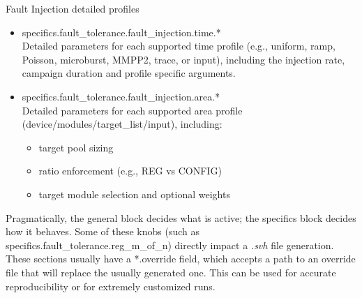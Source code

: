  Fault Injection detailed profiles
\begin{itemize}
    \item specifics.fault\_tolerance.fault\_injection.time.* \\
    Detailed parameters for each supported time profile (e.g., uniform, ramp, Poisson, microburst, MMPP2, trace, or input), including the injection rate, campaign duration and profile specific arguments.
    \item specifics.fault\_tolerance.fault\_injection.area.* \\
    Detailed parameters for each supported area profile (device/modules/target\_list/input), including:
    \begin{itemize}
        \item target pool sizing 
        \item ratio enforcement (e.g., REG vs CONFIG)
        \item target module selection and optional weights
    \end{itemize}
\end{itemize}

 Pragmatically, the general block decides what is active; the specifics block decides how it behaves. Some of these knobs (such as specifics.fault\_tolerance.reg\_m\_of\_n) directly impact a \textit{.svh} file generation. These sections usually have a *.override field, which accepts a path to an override file that will replace the usually generated one. This can be used for accurate reproducibility or for extremely customized runs.


